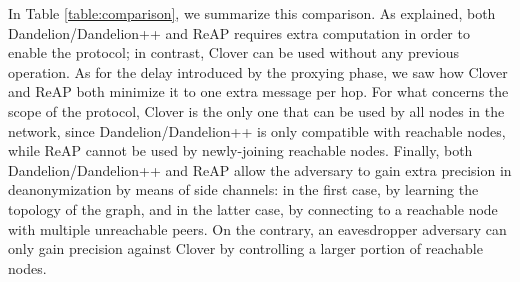 \documentclass{article}
\begin{document}
	In Table \ref{table:comparison}, we summarize this comparison. 
	As explained, both Dandelion/Dandelion++ and ReAP requires extra computation in order to enable the protocol; in contrast, Clover can be used without any previous operation.
	As for the delay introduced by the proxying phase, we saw how Clover and ReAP both minimize it to one extra message per hop.
	For what concerns the scope of the protocol, Clover is the only one that can be used by all nodes in the network, since Dandelion/Dandelion++ is only compatible with reachable nodes, while ReAP cannot be used by newly-joining reachable nodes.
	Finally, both Dandelion/Dandelion++ and ReAP allow the adversary to gain extra precision in deanonymization by means of side channels:
	in the first case, by learning the topology of the graph, and in the latter case, by connecting to a reachable node with multiple unreachable peers.
	On the contrary, an eavesdropper adversary can only gain precision against Clover by controlling a larger portion of reachable nodes.
	
	
	
\end{document}
